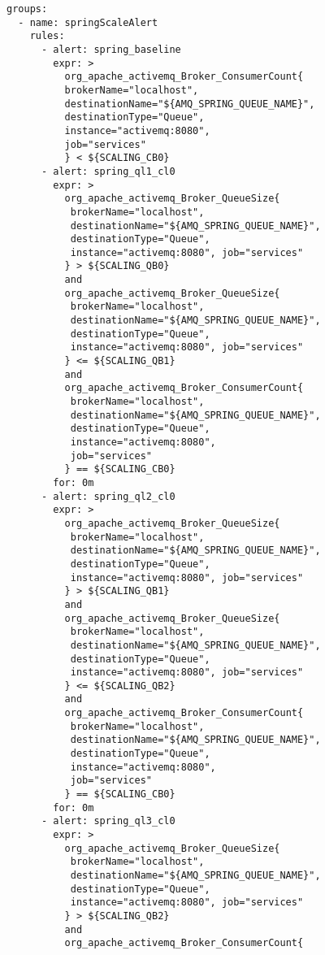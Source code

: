 \begin{lstlisting}[style=bashStyle,caption={alert-unparsed.yml},label=lst:alert-unparsed]
	groups:
  - name: springScaleAlert
    rules:
      - alert: spring_baseline
        expr: >
          org_apache_activemq_Broker_ConsumerCount{
          brokerName="localhost",
          destinationName="${AMQ_SPRING_QUEUE_NAME}", 
          destinationType="Queue",
          instance="activemq:8080", 
          job="services"
          } < ${SCALING_CB0}
      - alert: spring_ql1_cl0
        expr: >
          org_apache_activemq_Broker_QueueSize{
           brokerName="localhost", 
           destinationName="${AMQ_SPRING_QUEUE_NAME}",
           destinationType="Queue", 
           instance="activemq:8080", job="services"
          } > ${SCALING_QB0}
          and 
          org_apache_activemq_Broker_QueueSize{
           brokerName="localhost", 
           destinationName="${AMQ_SPRING_QUEUE_NAME}",
           destinationType="Queue", 
           instance="activemq:8080", job="services"
          } <= ${SCALING_QB1}
          and 
          org_apache_activemq_Broker_ConsumerCount{
           brokerName="localhost",
           destinationName="${AMQ_SPRING_QUEUE_NAME}", 
           destinationType="Queue",
           instance="activemq:8080", 
           job="services"
          } == ${SCALING_CB0}
        for: 0m
      - alert: spring_ql2_cl0
        expr: >
          org_apache_activemq_Broker_QueueSize{
           brokerName="localhost", 
           destinationName="${AMQ_SPRING_QUEUE_NAME}",
           destinationType="Queue", 
           instance="activemq:8080", job="services"
          } > ${SCALING_QB1}
          and 
          org_apache_activemq_Broker_QueueSize{
           brokerName="localhost", 
           destinationName="${AMQ_SPRING_QUEUE_NAME}",
           destinationType="Queue", 
           instance="activemq:8080", job="services"
          } <= ${SCALING_QB2}
          and 
          org_apache_activemq_Broker_ConsumerCount{
           brokerName="localhost",
           destinationName="${AMQ_SPRING_QUEUE_NAME}", 
           destinationType="Queue",
           instance="activemq:8080", 
           job="services"
          } == ${SCALING_CB0}
        for: 0m
      - alert: spring_ql3_cl0
        expr: >
          org_apache_activemq_Broker_QueueSize{
           brokerName="localhost", 
           destinationName="${AMQ_SPRING_QUEUE_NAME}",
           destinationType="Queue", 
           instance="activemq:8080", job="services"
          } > ${SCALING_QB2}
          and 
          org_apache_activemq_Broker_ConsumerCount{

\end{lstlisting}
